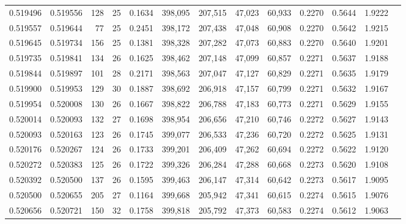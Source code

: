\begin{tabular}{rrrrrrrrrrrrr}
0.519496 & 0.519556 & 128 &  25 &                                     0.1634 & 398,095 & 207,515 &  47,023 &  60,933 & 0.2270 & 0.5644 & 1.9222 \\
0.519557 & 0.519644 &  77 &  25 &                                     0.2451 & 398,172 & 207,438 &  47,048 &  60,908 & 0.2270 & 0.5642 & 1.9215 \\
0.519645 & 0.519734 & 156 &  25 &                                     0.1381 & 398,328 & 207,282 &  47,073 &  60,883 & 0.2270 & 0.5640 & 1.9201 \\
0.519735 & 0.519841 & 134 &  26 &                                     0.1625 & 398,462 & 207,148 &  47,099 &  60,857 & 0.2271 & 0.5637 & 1.9188 \\
0.519844 & 0.519897 & 101 &  28 &                                     0.2171 & 398,563 & 207,047 &  47,127 &  60,829 & 0.2271 & 0.5635 & 1.9179 \\
0.519900 & 0.519953 & 129 &  30 &                                     0.1887 & 398,692 & 206,918 &  47,157 &  60,799 & 0.2271 & 0.5632 & 1.9167 \\
0.519954 & 0.520008 & 130 &  26 &                                     0.1667 & 398,822 & 206,788 &  47,183 &  60,773 & 0.2271 & 0.5629 & 1.9155 \\
0.520014 & 0.520093 & 132 &  27 &                                     0.1698 & 398,954 & 206,656 &  47,210 &  60,746 & 0.2272 & 0.5627 & 1.9143 \\
0.520093 & 0.520163 & 123 &  26 &                                     0.1745 & 399,077 & 206,533 &  47,236 &  60,720 & 0.2272 & 0.5625 & 1.9131 \\
0.520176 & 0.520267 & 124 &  26 &                                     0.1733 & 399,201 & 206,409 &  47,262 &  60,694 & 0.2272 & 0.5622 & 1.9120 \\
0.520272 & 0.520383 & 125 &  26 &                                     0.1722 & 399,326 & 206,284 &  47,288 &  60,668 & 0.2273 & 0.5620 & 1.9108 \\
0.520392 & 0.520500 & 137 &  26 &                                     0.1595 & 399,463 & 206,147 &  47,314 &  60,642 & 0.2273 & 0.5617 & 1.9095 \\
0.520500 & 0.520655 & 205 &  27 &                                     0.1164 & 399,668 & 205,942 &  47,341 &  60,615 & 0.2274 & 0.5615 & 1.9076 \\
0.520656 & 0.520721 & 150 &  32 &                                     0.1758 & 399,818 & 205,792 &  47,373 &  60,583 & 0.2274 & 0.5612 & 1.9063 \\

\end{tabular}
